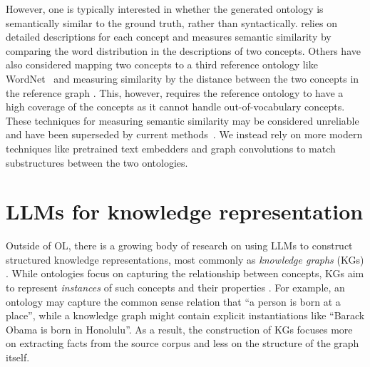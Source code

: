 However, one is typically interested in whether the generated ontology is semantically similar to the ground truth, rather than syntactically. \citet{Zavitsanos2011GoldSE} relies on detailed descriptions for each concept and measures semantic similarity by comparing the word distribution in the descriptions of two concepts. Others have also considered mapping two concepts to a third reference ontology like WordNet~\cite{maedche2002measuring} and measuring similarity by the distance between the two concepts in the reference graph \cite{Treeratpituk2013GraphbasedAT}. This, however, requires the reference ontology to have a high coverage of the concepts as it cannot handle out-of-vocabulary concepts. These techniques for measuring semantic similarity may be considered unreliable and have been superseded by current methods~\cite{conneau2017supervised}. We instead rely on more modern techniques like pretrained text embedders \cite{devlin2018bert} and graph convolutions \cite{kipf2016semi} to match substructures between the two ontologies.

\section{LLMs for knowledge representation}

Outside of OL, there is a growing body of research on using LLMs to construct structured knowledge representations, most commonly as \emph{knowledge graphs} (KGs) \cite{singhal2012introducing}. While ontologies focus on capturing the relationship between concepts, KGs aim to represent \emph{instances} of such concepts and their properties \cite{guarino1995ontologies}. For example, an ontology may capture the common sense relation that ``a person is born at a place'', while a knowledge graph might contain explicit instantiations like ``Barack Obama is born in Honolulu''. As a result, the construction of KGs focuses more on extracting facts from the source corpus and less on the structure of the graph itself.

